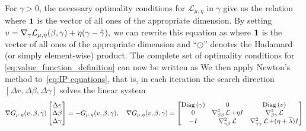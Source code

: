 For $\gamma>0$, the necessary optimality conditions 
for $\mathcal{L}_{\mu,\eta}$ in $\gamma$ give us the relation 
where $\mathbf{1}$ is the vector of all ones of the 
appropriate dimension.
By setting 
\(
v=\nabla_\gamma \mathcal{L}_{\mu,\eta}(\beta,\gamma)+\eta(\gamma - \hat \gamma),
\) 
we can rewrite this equation as
where $\mathbf{1}$ is the vector of all ones of the appropriate dimension and
``$\odot$'' denotes the Hadamard (or simply element-wise) product.
The complete set of optimality conditions for 
\eqref{eq:value_function_definition} can now be written as
We then apply Newton's method to~\eqref{eq:IP equations}, 
that is, in each iteration the search direction $[\Delta v, \Delta \beta, \Delta \gamma]$ solves the linear system
\[
	\nabla G_{\mu,\eta}(v, \beta, \gamma)\begin{bmatrix}
		\Delta v \\
		\Delta \beta \\
		\Delta \gamma
	\end{bmatrix} = -G_{\mu,\eta}(v, \beta, \gamma), \quad
	\nabla G_{\mu, \eta}(v, \beta, \gamma) = \begin{bmatrix}
 		\mathrm{Diag}\left(\gamma\right) & 0 & \mathrm{Diag}\left(v\right) \\
 		0 & \nabla^2_{\beta\beta}\operatorname{\mathcal{L}} + \eta I & \nabla^2_{\beta\gamma} \operatorname{\mathcal{L}}\\
 		-I & \nabla^2_{\gamma\beta}\operatorname{\mathcal{L}} & \nabla^2_{\gamma\gamma}\operatorname{\mathcal{L}} + (\eta + \overline{\lambda})	 I
 	\end{bmatrix}
\]
